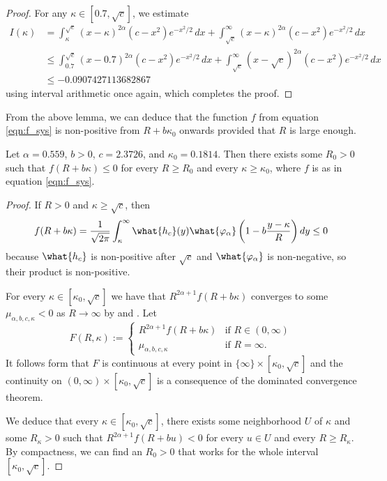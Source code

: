 \documentclass[12pt]{amsart}
\numberwithin{equation}{section}
\begin{document}
\begin{proof}
For any $\kappa \in [0.7,\sqrt{c}]$, we estimate
\begin{align*}
I(\kappa) &= \int_\kappa^{\sqrt{c}} (x-\kappa)^{2\alpha}(c-x^2) e^{-x^2/2} \,dx + \int_{\sqrt{c}}^\infty (x-\kappa)^{2\alpha} (c-x^2) e^{-x^2/2} \,dx \\
& \leq  \int_{0.7}^{\sqrt{c}} (x-0.7)^{2\alpha} (c-x^2) e^{-x^2/2} \,dx+\int_{\sqrt{c}}^\infty (x-\sqrt{c})^{2\alpha} (c-x^2) e^{-x^2/2} \,dx \\
&\leq -0.0907427113682867
\end{align*}
using interval arithmetic once again, which completes the proof.
\end{proof}

From the above lemma, we can deduce that the function $f$ from equation \eqref{eqn:f_sys} is non-positive from $R+b\kappa_0$ onwards provided that $R$ is large enough.

\begin{cor} \label{cor:non-positive}
Let  $\alpha = 0.559$, $b>0$, $c=2.3726$, and $\kappa_0 = 0.1814$. Then there exists some $R_0 >0$ such that $f(R+b \kappa) \leq 0$ for every $R \geq R_0$ and every $\kappa \geq \kappa_0$, where $f$ is as in equation \eqref{eqn:f_sys}.
\end{cor}

\begin{proof}
If $R>0$ and $\kappa \geq \sqrt{c}$, then
\[
f(R+b\kappa) = \frac{1}{\sqrt{2\pi}} \int_\kappa^\infty \what{h_c}(y)\what{\varphi_\alpha} \left( 1 - b \frac{y-\kappa}{R} \right) dy \leq 0
\]
because $\what{h_c}$ is non-positive after $\sqrt{c}$ and $\what{\varphi_\alpha}$ is non-negative, so their product is non-positive.

For every $\kappa  \in [\kappa_0, \sqrt{c}]$ we have that
$R^{2\alpha+1}f(R+b\kappa)$ converges to some $\mu_{\alpha,b,c,\kappa} < 0$ as $R \to \infty$ by  and . Let 
\[
F(R,\kappa) := \begin{cases} R^{2\alpha+1}f(R+b\kappa) & \text{if }R \in (0,\infty) \\ \mu_{\alpha,b,c,\kappa} & \text{if }R=\infty.\end{cases}
\]
It follows form  that $F$ is continuous at every point in $\{\infty\} \times [\kappa_0, \sqrt{c}]$ and the continuity on $(0,\infty)\times [\kappa_0, \sqrt{c}]$ is a consequence of the dominated convergence theorem.

We deduce that every $\kappa \in [\kappa_0, \sqrt{c}]$, there exists some neighborhood $U$ of $\kappa$ and some $R_\kappa > 0$ such that $R^{2\alpha+1}f(R+b u) < 0$ for every $u \in U$ and every $R \geq R_\kappa$. By compactness, we can find an $R_0>0$ that works for the whole interval $[\kappa_0, \sqrt{c}]$.
\end{proof}
\end{document}
